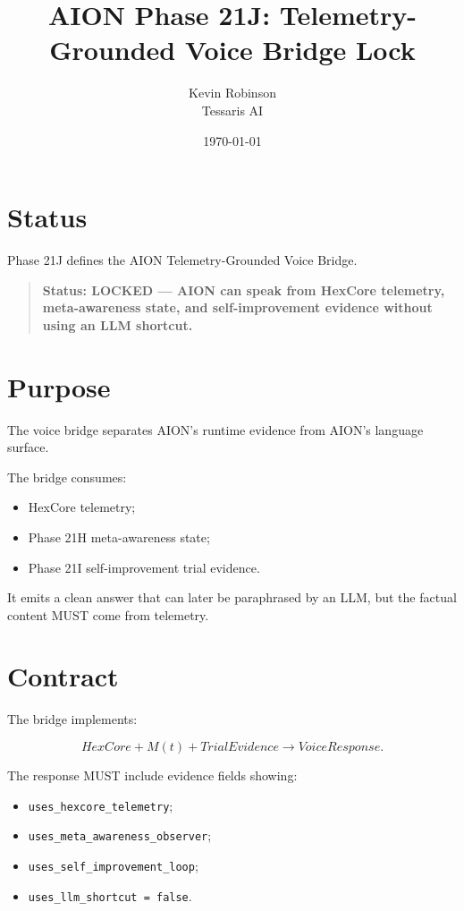 \documentclass[11pt,a4paper]{article}
\title{\textbf{AION Phase 21J: Telemetry-Grounded Voice Bridge Lock}}
\author{Kevin Robinson\\Tessaris AI}
\date{\today}
\begin{document}
\maketitle

\section{Status}

Phase 21J defines the AION Telemetry-Grounded Voice Bridge.

\begin{quote}
\textbf{Status: LOCKED --- AION can speak from HexCore telemetry, meta-awareness state, and self-improvement evidence without using an LLM shortcut.}
\end{quote}

\section{Purpose}

The voice bridge separates AION's runtime evidence from AION's language surface.

The bridge consumes:

\begin{itemize}
  \item HexCore telemetry;
  \item Phase 21H meta-awareness state;
  \item Phase 21I self-improvement trial evidence.
\end{itemize}

It emits a clean answer that can later be paraphrased by an LLM, but the factual content MUST come from telemetry.

\section{Contract}

The bridge implements:

\[
HexCore + M(t) + TrialEvidence \rightarrow VoiceResponse.
\]

The response MUST include evidence fields showing:

\begin{itemize}
  \item \texttt{uses\_hexcore\_telemetry};
  \item \texttt{uses\_meta\_awareness\_observer};
  \item \texttt{uses\_self\_improvement\_loop};
  \item \texttt{uses\_llm\_shortcut = false}.
\end{itemize}
\end{document}
